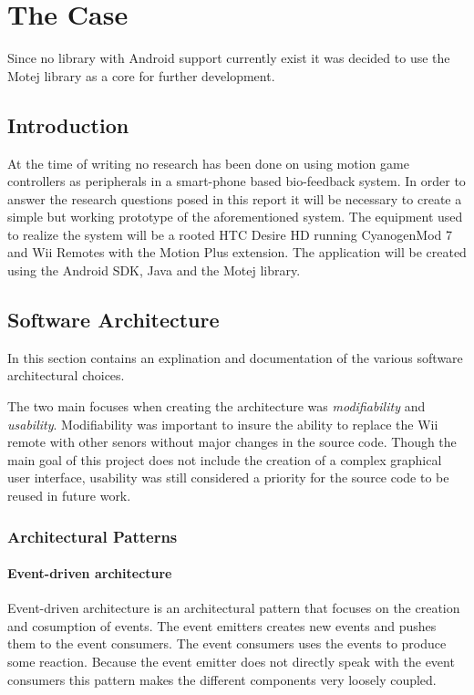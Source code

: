 \chapter{The Case}
Since no library with Android support currently exist it was decided to use the Motej library as a core for further development.

\section{Introduction}
At the time of writing no research has been done on using motion game controllers as peripherals in a smart-phone based bio-feedback system. In order to answer the research questions posed in this report it will be necessary to create a simple but working prototype of the aforementioned system. The equipment used to realize the system will be a rooted HTC Desire HD \cite{desireHdSpecs} running CyanogenMod 7 and Wii Remotes with the Motion Plus extension. The application will be created using the Android SDK, Java and the Motej library.


\section{Software Architecture}
In this section contains an explination and documentation of the various software architectural choices.

The two main focuses when creating the architecture was \emph{modifiability} and \emph{usability}. Modifiability was important to insure the ability to replace the Wii remote with other senors without major changes in the source code. Though the main goal of this project does not include the creation of a complex graphical user interface, usability was still considered a priority for the source code to be reused in future work. 

\subsection{Architectural Patterns}
\subsubsection{Event-driven architecture}
Event-driven architecture is an architectural pattern that focuses on the creation and cosumption of events. The event emitters creates new events and pushes them to the event consumers. The event consumers uses the events to produce some reaction. Because the event emitter does not directly speak with the event consumers this pattern makes the different components very loosely coupled.


